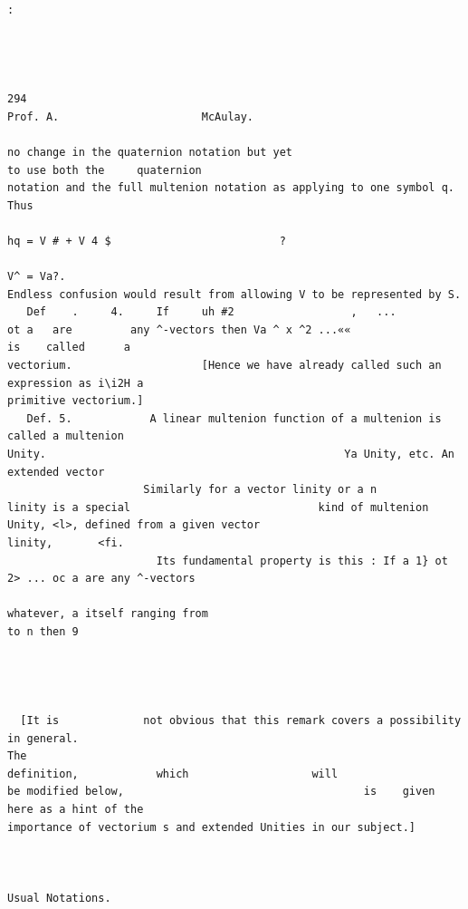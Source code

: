 \documentclass[10pt]{article}
\begin{document}
\clearpage
\begin{verbatim}

                                                                                                                                    :




294                                                                               Prof. A.                      McAulay.

no change in the quaternion notation but yet                                                                                                to use both the     quaternion
notation and the full multenion notation as applying to one symbol q.                                                                                                      Thus
                                                                      hq = V # + V 4 $                          ?
                                                                                                                             V^ = Va?.
Endless confusion would result from allowing V to be represented by S.
   Def    .     4.     If     uh #2                  ,   ...              ot a   are         any ^-vectors then Va ^ x ^2 ...««                                is    called      a
vectorium.                    [Hence we have already called such an expression as i\i2H a
primitive vectorium.]
   Def. 5.            A linear multenion function of a multenion is called a multenion
Unity.                                              Ya Unity, etc. An extended vector
                     Similarly for a vector linity or a n
linity is a special                             kind of multenion Unity, <l>, defined from a given vector
linity,       <fi.
                       Its fundamental property is this : If a 1} ot 2> ... oc a are any ^-vectors

whatever, a itself ranging from                                                                   to n then 9




  [It is             not obvious that this remark covers a possibility in general.                                                                                             The
definition,            which                   will                   be modified below,                                     is    given here as a hint of the
importance of vectorium s and extended Unities in our subject.]


                                                                                          Usual Notations.


\end{verbatim}
\end{document}

